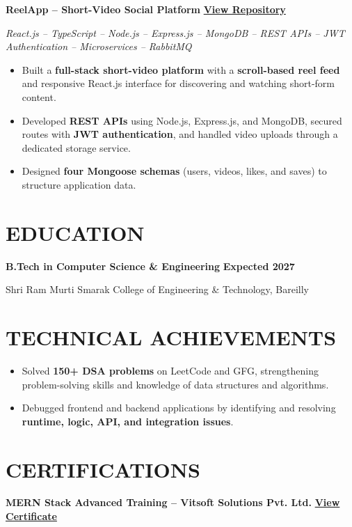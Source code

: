 \documentclass[10pt,a4paper]{article}
\begin{document}
\textbf{ReelApp -- Short-Video Social Platform}
\hfill
\href{https://github.com/Amjadkhan9756/ReelApp}
{\textbf{View Repository}}

\textit{React.js -- TypeScript -- Node.js -- Express.js -- MongoDB --
REST APIs -- JWT Authentication -- Microservices -- RabbitMQ}

\begin{itemize}
    \item Built a \textbf{full-stack short-video platform} with a
    \textbf{scroll-based reel feed} and responsive React.js interface
    for discovering and watching short-form content.

    \item Developed \textbf{REST APIs} using Node.js, Express.js,
    and MongoDB, secured routes with \textbf{JWT authentication},
    and handled video uploads through a dedicated storage service.

    \item Designed \textbf{four Mongoose schemas} (users, videos,
    likes, and saves) to structure application data.
\end{itemize}

\section{EDUCATION}

\textbf{B.Tech in Computer Science \& Engineering}
\hfill
\textbf{Expected 2027}

Shri Ram Murti Smarak College of Engineering \& Technology, Bareilly

\section{TECHNICAL ACHIEVEMENTS}

\begin{itemize}
    \item Solved \textbf{150+ DSA problems} on LeetCode and GFG,
    strengthening problem-solving skills and knowledge of
    data structures and algorithms.

    \item Debugged frontend and backend applications by identifying
    and resolving \textbf{runtime, logic, API, and integration issues}.
\end{itemize}

\section{CERTIFICATIONS}

\textbf{MERN Stack Advanced Training -- Vitsoft Solutions Pvt. Ltd.}
\hfill
\href{https://github.com/Amjadkhan9756/certification/blob/main/Amjad_Intern\%20(1).pdf}
{\textbf{View Certificate}}
\end{document}
